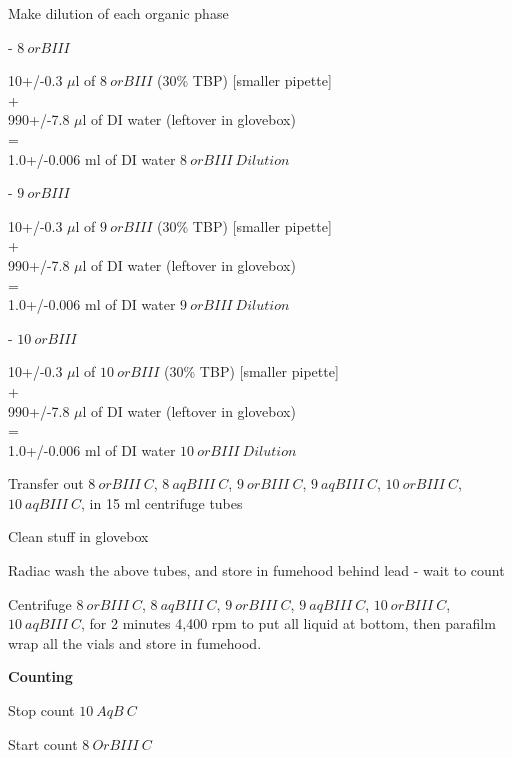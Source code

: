 \documentclass[idxtotoc,hyperref,openany,oneside]{labbook} %
\newcommand{\cmark}{\ding{51}}%
\newcommand{\done}{\rlap{$\square$}{\raisebox{2pt}{\large\hspace{1pt}\cmark}}%
  \hspace{-2.5pt}}
\begin{document}
\begin{todolist}
\item[\done]{Make dilution of each organic phase}
  \begin{todolist}
  \item[\done]{- $\boxed{8\ orBIII}$}
  \end{todolist}
  \begin{center}
    10+/-0.3 $\mu$l of $\boxed{8\ orBIII}$
    (30\% TBP) [smaller pipette]\\
    +\\
    990+/-7.8 $\mu$l of DI water (leftover in glovebox)\\
    =\\
    1.0+/-0.006 ml of DI water $\boxed{8\ orBIII\ Dilution}$
  \end{center}
  \begin{todolist}
  \item[\done]{- $\boxed{9\ orBIII}$}
  \end{todolist}
  \begin{center}
    10+/-0.3 $\mu$l of $\boxed{9\ orBIII}$
    (30\% TBP) [smaller pipette]\\
    +\\
    990+/-7.8 $\mu$l of DI water (leftover in glovebox)\\
    =\\
    1.0+/-0.006 ml of DI water $\boxed{9\ orBIII\ Dilution}$
  \end{center}
  \begin{todolist}
  \item[\done]{- $\boxed{10\ orBIII}$}
  \end{todolist}
  \begin{center}
    10+/-0.3 $\mu$l of $\boxed{10\ orBIII}$
    (30\% TBP) [smaller pipette]\\
    +\\
    990+/-7.8 $\mu$l of DI water (leftover in glovebox)\\
    =\\
    1.0+/-0.006 ml of DI water $\boxed{10\ orBIII\ Dilution}$
  \end{center}
 
\item[\done]{Transfer out $\boxed{8\ orBIII\ C}$, $\boxed{8\ aqBIII\ C}$,
  $\boxed{9\ orBIII\ C}$, $\boxed{9\ aqBIII\ C}$, $\boxed{10\ orBIII\ C}$,
  $\boxed{10\ aqBIII\ C}$, in 15 ml centrifuge tubes}
\item[\done]{Clean stuff in glovebox}
\item{Radiac wash the above tubes, and store in fumehood behind
  lead - wait to count}
\item[\done]{Centrifuge $\boxed{8\ orBIII\ C}$, $\boxed{8\ aqBIII\ C}$,
  $\boxed{9\ orBIII\ C}$, $\boxed{9\ aqBIII\ C}$, $\boxed{10\ orBIII\ C}$,
  $\boxed{10\ aqBIII\ C}$, for 2 minutes 4,400 rpm to put all liquid at
  bottom, then parafilm wrap all the vials and store in fumehood.}
\end{todolist}
\textbf{Counting}
\begin{todolist}
\item[\done]{Stop count $\boxed{10\ AqB\ C}$}
\item[\done]{Start count $\boxed{8\ OrBIII\ C}$}
\end{todolist}
\end{document}
